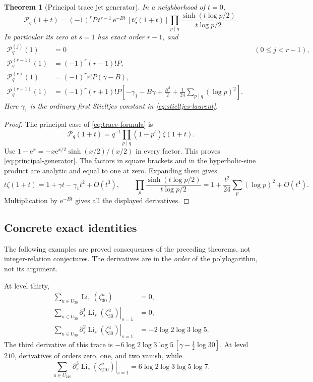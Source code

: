 \documentclass[11pt]{article}
\numberwithin{equation}{section}
\newtheorem{theorem}{Theorem}[section]
\theoremstyle{definition}
\theoremstyle{remark}
\DeclareMathOperator{\Li}{Li}
\newcommand{\ee}{\mathrm e}
\newcommand{\cP}{\mathcal P}
\newcommand{\Liord}[2]{\left.\partial_s^{#1}\Li_s(#2)\right|_{s=1}}
\begin{document}
\begin{theorem}[Principal trace jet generator]\label{thm:principal}
In a neighborhood of $t=0$,
\begin{equation}\label{eq:principal-generator}
 \boxed{\displaystyle
 \cP_q(1+t)=(-1)^rP\,t^{r-1}\,
 \ee^{-Bt}\,[t\zeta(1+t)]
 \prod_{p\mid q}\frac{\sinh(t\log p/2)}{t\log p/2}.}
\end{equation}
In particular its zero at $s=1$ has exact order $r-1$, and
\begin{align}
 \cP_q^{(j)}(1)&=0 &&(0\le j<r-1),\label{eq:principal-vanish}\\
 \cP_q^{(r-1)}(1)&=(-1)^r(r-1)!P,\label{eq:principal-first}\\
 \cP_q^{(r)}(1)&=(-1)^r r!P(\gamma-B),\label{eq:principal-second}\\
 \cP_q^{(r+1)}(1)&=(-1)^r(r+1)!P
 \left[-\gamma_1-B\gamma+\frac{B^2}{2}
 +\frac1{24}\sum_{p\mid q}(\log p)^2\right].
 \label{eq:principal-third}
\end{align}
Here $\gamma_1$ is the ordinary first Stieltjes constant in
\eqref{eq:stieltjes-laurent}.
\end{theorem}
\begin{proof}
The principal case of \eqref{eq:trace-formula} is
\[
 \cP_q(1+t)=q^{-t}\prod_{p\mid q}(1-p^t)\zeta(1+t).
\]
Use $1-\ee^x=-x\ee^{x/2}\sinh(x/2)/(x/2)$ in every factor.
This proves \eqref{eq:principal-generator}.
The factors in square brackets and in the hyperbolic-sine product are
analytic and equal to one at zero. Expanding them gives
\[
 t\zeta(1+t)=1+\gamma t-\gamma_1t^2+O(t^3),\qquad
 \prod_p\frac{\sinh(t\log p/2)}{t\log p/2}
 =1+\frac{t^2}{24}\sum_p(\log p)^2+O(t^4).
\]
Multiplication by $\ee^{-Bt}$ gives all the displayed derivatives.
\end{proof}

\subsection{Concrete exact identities}
The following examples are proved consequences of the preceding
theorems, not integer-relation conjectures. The derivatives are in the
\emph{order} of the polylogarithm, not its argument.

At level thirty,
\begin{align}
 \sum_{u\in U_{30}}\Li_1(\zeta_{30}^u)&=0,\label{eq:q30-zero}\\
 \sum_{u\in U_{30}}\Liord{1}{\zeta_{30}^u}&=0,\label{eq:q30-first}\\
 \sum_{u\in U_{30}}\Liord{2}{\zeta_{30}^u}
 &=\boxed{-2\log2\log3\log5}.\label{eq:q30-second}
\end{align}
The third derivative of this trace is
$-6\log2\log3\log5\,[\gamma-\frac12\log30]$.
At level $210$, derivatives of orders zero, one, and two vanish, while
\begin{equation}\label{eq:q210}
 \sum_{u\in U_{210}}\Liord{3}{\zeta_{210}^u}
 =6\log2\log3\log5\log7.
\end{equation}
\end{document}

